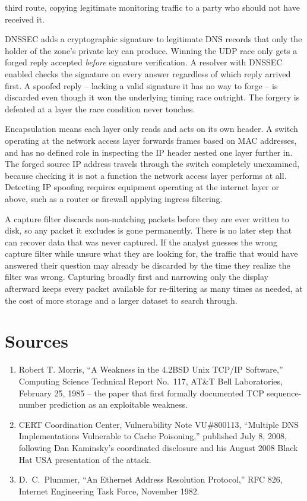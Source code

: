 \begin{answerkey}
third route, copying legitimate monitoring traffic to a party who should not have received it.
\item DNSSEC adds a cryptographic signature to legitimate DNS records that only the holder of the
zone's private key can produce. Winning the UDP race only gets a forged reply accepted \emph{before}
signature verification. A resolver with DNSSEC enabled checks the signature on every answer
regardless of which reply arrived first. A spoofed reply -- lacking a valid signature it has no
way to forge -- is discarded even though it won the underlying timing race outright. The forgery is
defeated at a layer the race condition never touches.
\item Encapsulation means each layer only reads and acts on its own header. A switch operating at
the network access layer forwards frames based on MAC addresses, and has no defined role in
inspecting the IP header nested one layer further in. The forged source IP address travels through
the switch completely unexamined, because checking it is not a function the network access layer
performs at all. Detecting IP spoofing requires equipment operating at the internet layer or
above, such as a router or firewall applying ingress filtering.
\item A capture filter discards non-matching packets before they are ever written to disk, so any
packet it excludes is gone permanently. There is no later step that can recover data that was
never captured. If the analyst guesses the wrong capture filter while unsure what they are looking
for, the traffic that would have answered their question may already be discarded by the time they
realize the filter was wrong. Capturing broadly first and narrowing only the display afterward
keeps every packet available for re-filtering as many times as needed, at the cost of more storage
and a larger dataset to search through.
\end{answerkey}

\section*{Sources}
\begin{enumerate}[label=\lbrack\arabic*\rbrack, leftmargin=2.2em]
\item {}Robert T. Morris, ``A Weakness in the 4.2BSD Unix TCP/IP Software,'' Computing
Science Technical Report No.\ 117, AT\&T Bell Laboratories, February 25, 1985 -- the paper that
first formally documented TCP sequence-number prediction as an exploitable weakness.
\item {}CERT Coordination Center, Vulnerability Note VU\#800113, ``Multiple DNS
Implementations Vulnerable to Cache Poisoning,'' published July 8, 2008, following Dan Kaminsky's
coordinated disclosure and his August 2008 Black Hat USA presentation of the attack.
\item {}D.\ C.\ Plummer, ``An Ethernet Address Resolution Protocol,'' RFC 826,
Internet Engineering Task Force, November 1982.
\end{enumerate}
